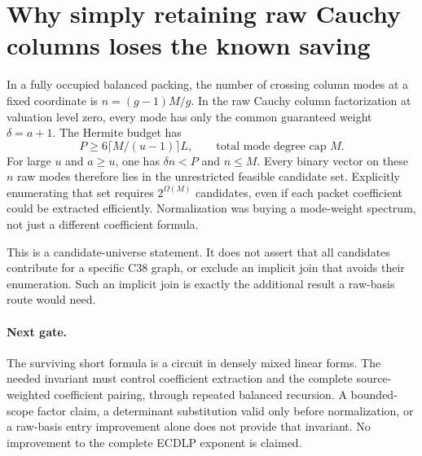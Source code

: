 \documentclass[11pt]{article}
\begin{document}
\section{Why simply retaining raw Cauchy columns loses the known saving}
In a fully occupied balanced packing, the number of crossing column
modes at a fixed coordinate is $n=(g-1)M/g$. In the raw Cauchy column
factorization at valuation level zero, every mode has only the common
guaranteed weight $\delta=a+1$. The Hermite budget has
\[
 P\ge 6\lceil M/(u-1)\rceil L,
 \qquad \text{total mode degree cap }M.
\]
For large $u$ and $a\ge u$, one has $\delta n<P$ and $n\le M$.
Every binary vector on these $n$ raw modes therefore lies in the
unrestricted feasible candidate set. Explicitly enumerating that set
requires $2^{\Omega(M)}$ candidates, even if each packet coefficient
could be extracted efficiently. Normalization was buying a mode-weight
spectrum, not just a different coefficient formula.

This is a candidate-universe statement. It does not assert that all
candidates contribute for a specific C38 graph, or exclude an implicit
join that avoids their enumeration. Such an implicit join is exactly
the additional result a raw-basis route would need.

\paragraph{Next gate.}
The surviving short formula is a circuit in densely mixed linear forms.
The needed invariant must control coefficient extraction and the complete
source-weighted coefficient pairing, through repeated balanced recursion.
A bounded-scope factor claim, a determinant substitution valid only before
normalization, or a raw-basis entry improvement alone does not provide
that invariant. No improvement to the complete ECDLP exponent is claimed.
\end{document}
